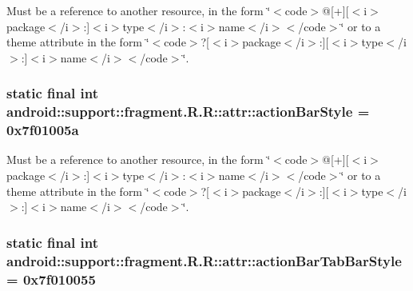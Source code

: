Must be a reference to another resource, in the form \char`\"{}$<$code$>$@\mbox{[}+\mbox{]}\mbox{[}$<$i$>$package$<$/i$>$:\mbox{]}$<$i$>$type$<$/i$>$:$<$i$>$name$<$/i$>$$<$/code$>$\char`\"{} or to a theme attribute in the form \char`\"{}$<$code$>$?\mbox{[}$<$i$>$package$<$/i$>$:\mbox{]}\mbox{[}$<$i$>$type$<$/i$>$:\mbox{]}$<$i$>$name$<$/i$>$$<$/code$>$\char`\"{}. \hypertarget{classandroid_1_1support_1_1fragment_1_1_r_1_1attr_f5ab4ca6451c2a02f30b9950a2514bca}{
\subsubsection[{actionBarStyle}]{\setlength{\rightskip}{0pt plus 5cm}static final int android::support::fragment.R.R::attr::actionBarStyle = 0x7f01005a}}
\label{classandroid_1_1support_1_1fragment_1_1_r_1_1attr_f5ab4ca6451c2a02f30b9950a2514bca}


Must be a reference to another resource, in the form \char`\"{}$<$code$>$@\mbox{[}+\mbox{]}\mbox{[}$<$i$>$package$<$/i$>$:\mbox{]}$<$i$>$type$<$/i$>$:$<$i$>$name$<$/i$>$$<$/code$>$\char`\"{} or to a theme attribute in the form \char`\"{}$<$code$>$?\mbox{[}$<$i$>$package$<$/i$>$:\mbox{]}\mbox{[}$<$i$>$type$<$/i$>$:\mbox{]}$<$i$>$name$<$/i$>$$<$/code$>$\char`\"{}. \hypertarget{classandroid_1_1support_1_1fragment_1_1_r_1_1attr_44f4df36f857183abe67a7174784a9d5}{
\subsubsection[{actionBarTabBarStyle}]{\setlength{\rightskip}{0pt plus 5cm}static final int android::support::fragment.R.R::attr::actionBarTabBarStyle = 0x7f010055}}
\label{classandroid_1_1support_1_1fragment_1_1_r_1_1attr_44f4df36f857183abe67a7174784a9d5}


